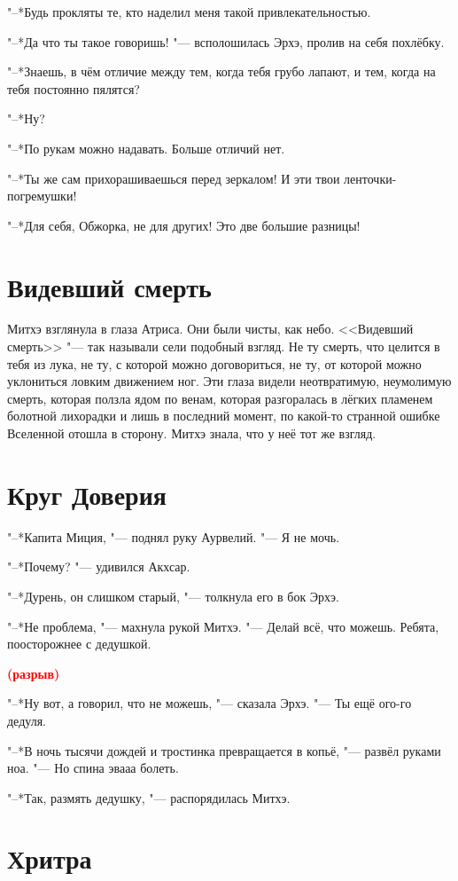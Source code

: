 \documentclass[a4paper,10pt,fleqn]{book}
\newcommand{\ldotst}{\so{...}\xspace}
\newcommand{\spacing}{\textcolor{red}{\textbf{(разрыв)}}}
\begin{document}
"--*Будь прокляты те, кто наделил меня такой привлекательностью.

"--*Да что ты такое говоришь! "--- всполошилась Эрхэ, пролив на себя похлёбку.

"--*Знаешь, в чём отличие между тем, когда тебя грубо лапают, и тем, когда на тебя постоянно пялятся?

"--*Ну?

"--*По рукам можно надавать.
Больше отличий нет.

"--*Ты же сам прихорашиваешься перед зеркалом!
И эти твои ленточки-погремушки!

"--*Для себя, Обжорка, не для других!
Это две большие разницы!

\section{Видевший смерть}

Митхэ взглянула в глаза Атриса.
Они были чисты, как небо.
<<Видевший смерть>> "--- так называли сели подобный взгляд.
Не ту смерть, что целится в тебя из лука, не ту, с которой можно договориться, не ту, от которой можно уклониться ловким движением ног.
Эти глаза видели неотвратимую, неумолимую смерть, которая ползла ядом по венам, которая разгоралась в лёгких пламенем болотной лихорадки и лишь в последний момент, по какой-то странной ошибке Вселенной отошла в сторону.
Митхэ знала, что у неё тот же взгляд.

\section{Круг Доверия}

"--*Капита Миция, "--- поднял руку Аурвелий.
"--- Я не мочь.

"--*Почему? "--- удивился Акхсар.

"--*Дурень, он слишком старый, "--- толкнула его в бок Эрхэ.

"--*Не проблема, "--- махнула рукой Митхэ.
"--- Делай всё, что можешь.
Ребята, поосторожнее с дедушкой.

\spacing

"--*Ну вот, а говорил, что не можешь, "--- сказала Эрхэ.
"--- Ты ещё ого-го дедуля.

"--*В ночь тысячи дождей и тростинка превращается в копьё, "--- развёл руками ноа.
"--- Но спина\ldotst эвааа\ldotst болеть.

"--*Так, размять дедушку, "--- распорядилась Митхэ.

\section{Хритра}
\end{document}
